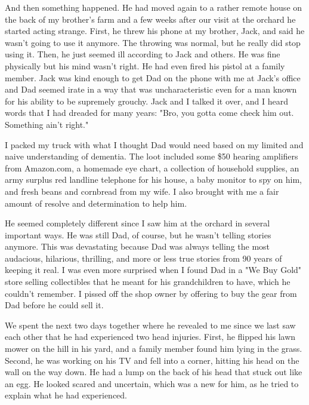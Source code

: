 \documentclass{article}
\begin{document}
And then something happened. He had moved again to a rather remote house on the back of my brother's farm and a few weeks after our visit at the orchard he started acting strange. First, he threw his phone at my brother, Jack, and said he wasn't going to use it anymore. The throwing was normal, but he really did stop using it. Then, he just seemed ill according to Jack and others. He was fine physically but his mind wasn't right. He had even fired his pistol at a family member. Jack was kind enough to get Dad on the phone with me at Jack's office and Dad seemed irate in a way that was uncharacteristic even for a man known for his ability to be supremely grouchy. Jack and I talked it over, and I heard words that I had dreaded for many years: "Bro, you gotta come check him out. Something ain't right."

I packed my truck with what I thought Dad would need based on my limited and naive understanding of dementia. The loot included some \$50 hearing amplifiers from Amazon.com, a homemade eye chart, a collection of household supplies, an army surplus red landline telephone for his house, a baby monitor to spy on him, and fresh beans and cornbread from my wife. I also brought with me a fair amount of resolve and determination to help him.

He seemed completely different since I saw him at the orchard in several important ways. He was still Dad, of course, but he wasn't telling stories anymore. This was devastating because Dad was always telling the most audacious, hilarious, thrilling, and more or less true stories from 90 years of keeping it real. I was even more surprised when I found Dad in a "We Buy Gold" store selling collectibles that he meant for his grandchildren to have, which he couldn't remember. I pissed off the shop owner by offering to buy the gear from Dad before he could sell it.

We spent the next two days together where he revealed to me since we last saw each other that he had experienced two head injuries. First, he flipped his lawn mower on the hill in his yard, and a family member found him lying in the grass. Second, he was working on his TV and fell into a corner, hitting his head on the wall on the way down. He had a lump on the back of his head that stuck out like an egg. He looked scared and uncertain, which was a new for him, as he tried to explain what he had experienced. 
\end{document}

